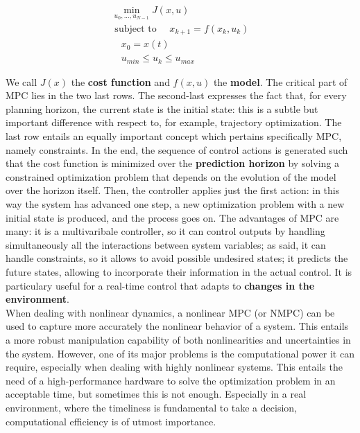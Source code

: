 \documentclass[a4paper, onecolumn, 12pt]{article}
\begin{document}
\begin{equation}
\begin{aligned}
    \min_{u_0,...,u_{N-1}}{J(x,u)} \\
    \text{ subject to }
        \quad x_{k+1} = f(x_k,u_k) \\
        \quad x_0 = x(t) \\
        \quad u_{min} \leq u_k \leq u_{max}
\end{aligned}
\end{equation}

We call $J(x)$ the \textbf{cost function} and $f(x,u)$ the \textbf{model}. The
critical part of MPC lies in the two last rows. The second-last expresses the
fact that, for every planning horizon, the current state is the initial state:
this is a subtle but important difference with respect to, for example,
trajectory optimization. The last row entails an equally important concept which
pertains specifically MPC, namely constraints. In the end, the sequence of
control actions is generated such that the cost function is minimized over the
\textbf{prediction horizon} by solving a constrained optimization problem that
depends on the evolution of the model over the horizon itself. Then, the
controller applies just the first action: in this way the system has advanced
one step, a new optimization problem with a new initial state is produced, and
the process goes on. The advantages of MPC are many: it is a multivaribale
controller, so it can control outputs by handling simultaneously all the
interactions between system variables; as said, it can handle constraints, so it
allows to avoid possible undesired states; it predicts the future states,
allowing to incorporate their information in the actual control. It is
particulary useful for a real-time control that adapts to \textbf{changes in the
environment}.\\
When dealing with nonlinear dynamics, a nonlinear MPC (or NMPC) can be used to
capture more accurately the nonlinear behavior of a system. This entails a more
robust manipulation capability of both nonlinearities and uncertainties in the
system. However, one of its major problems is the computational power it can
require, especially when dealing with highly nonlinear systems. This entails the
need of a high-performance hardware to solve the optimization problem in an
acceptable time, but sometimes this is not enough. Especially in a real
environment, where the timeliness is fundamental to take a decision,
computational efficiency is of utmost importance.
\end{document}
